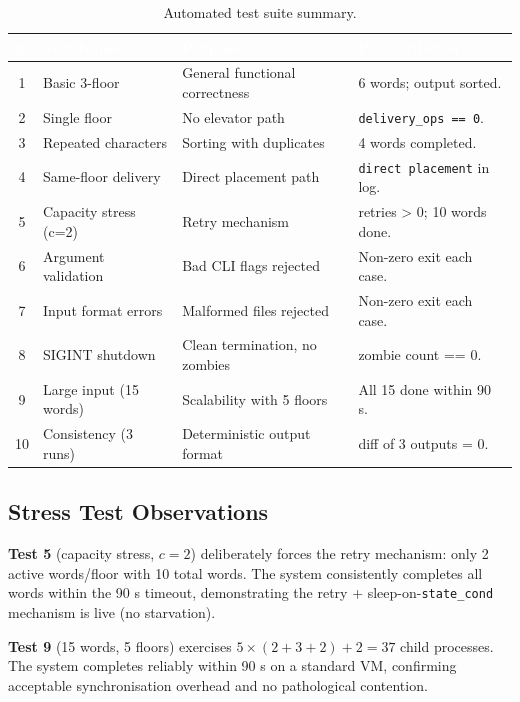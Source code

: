 \documentclass[12pt,a4paper]{article}
\newcommand{\code}[1]{\texttt{\small #1}}
\begin{document}
\begin{table}[htbp]
\centering
\caption{Automated test suite summary.}
\begin{tabularx}{\textwidth}{c l X l}
\toprule
\rowcolor{darkblue}
\textcolor{white}{\#} &
\textcolor{white}{Test Name} &
\textcolor{white}{Purpose} &
\textcolor{white}{Pass Criterion} \\
\midrule
1  & Basic 3-floor        & General functional correctness           & 6 words; output sorted. \\
\rowcolor{rowgray}
2  & Single floor         & No elevator path                         & \code{delivery\_ops == 0}. \\
3  & Repeated characters  & Sorting with duplicates                  & 4 words completed. \\
\rowcolor{rowgray}
4  & Same-floor delivery  & Direct placement path                    & \code{direct placement} in log. \\
5  & Capacity stress (c=2)& Retry mechanism                          & retries > 0; 10 words done. \\
\rowcolor{rowgray}
6  & Argument validation  & Bad CLI flags rejected                   & Non-zero exit each case. \\
7  & Input format errors  & Malformed files rejected                 & Non-zero exit each case. \\
\rowcolor{rowgray}
8  & SIGINT shutdown      & Clean termination, no zombies            & zombie count == 0. \\
9  & Large input (15 words)& Scalability with 5 floors               & All 15 done within 90 s. \\
\rowcolor{rowgray}
10 & Consistency (3 runs) & Deterministic output format              & diff of 3 outputs = 0. \\
\bottomrule
\end{tabularx}
\end{table}

\subsection{Stress Test Observations}

\textbf{Test 5} (capacity stress, $c=2$) deliberately forces the retry mechanism:
only 2 active words/floor with 10 total words. The system consistently completes
all words within the 90 s timeout, demonstrating the retry + sleep-on-\code{state\_cond}
mechanism is live (no starvation).

\textbf{Test 9} (15 words, 5 floors) exercises $5 \times (2+3+2) + 2 = 37$ child
processes. The system completes reliably within 90 s on a standard VM, confirming
acceptable synchronisation overhead and no pathological contention.
\end{document}

